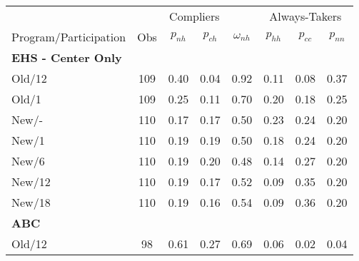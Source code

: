 \begin{tabular}{lccccccc}
\toprule 
\midrule 
\multicolumn{2}{c}{} & \multicolumn{2}{c}{Compliers} &  & \multicolumn{3}{c}{Always-Takers} \\
 \cmidrule(lr){3-4} \cmidrule(lr){6-8} 
Program/Participation & Obs & $p_{nh}$ & $p_{ch}$ & $\omega_{nh}$ & $p_{hh}$ & $p_{cc}$ & $p_{nn}$ \\
\midrule 
\textbf{EHS - Center Only} \\
\quad Old/12 & 109 & 0.40 & 0.04 & 0.92 & 0.11 & 0.08 & 0.37 \\
\quad Old/1 & 109 & 0.25 & 0.11 & 0.70 & 0.20 & 0.18 & 0.25 \\
\quad New/- & 110 & 0.17 & 0.17 & 0.50 & 0.23 & 0.24 & 0.20 \\
\quad New/1 & 110 & 0.19 & 0.19 & 0.50 & 0.18 & 0.24 & 0.20 \\
\quad New/6 & 110 & 0.19 & 0.20 & 0.48 & 0.14 & 0.27 & 0.20 \\
\quad New/12 & 110 & 0.19 & 0.17 & 0.52 & 0.09 & 0.35 & 0.20 \\
\quad New/18 & 110 & 0.19 & 0.16 & 0.54 & 0.09 & 0.36 & 0.20 \\
\textbf{ABC} \\
\quad Old/12 & 98 & 0.61 & 0.27 & 0.69 & 0.06 & 0.02 & 0.04 \\
\midrule 
\bottomrule 
\end{tabular}
